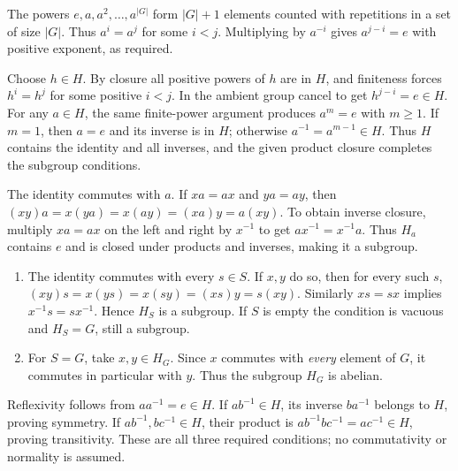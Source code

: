 
The powers $e,a,a^2,\ldots,a^{|G|}$ form $|G|+1$ elements counted with repetitions in a set of size $|G|$. Thus $a^i=a^j$ for some $i<j$. Multiplying by $a^{-i}$ gives $a^{j-i}=e$ with positive exponent, as required.


Choose $h\in H$. By closure all positive powers of $h$ are in $H$, and finiteness forces $h^i=h^j$ for some positive $i<j$. In the ambient group cancel to get $h^{j-i}=e\in H$. For any $a\in H$, the same finite-power argument produces $a^m=e$ with $m\ge1$. If $m=1$, then $a=e$ and its inverse is in $H$; otherwise $a^{-1}=a^{m-1}\in H$. Thus $H$ contains the identity and all inverses, and the given product closure completes the subgroup conditions.


The identity commutes with $a$. If $xa=ax$ and $ya=ay$, then $(xy)a=x(ya)=x(ay)=(xa)y=a(xy)$. To obtain inverse closure, multiply $xa=ax$ on the left and right by $x^{-1}$ to get $ax^{-1}=x^{-1}a$. Thus $H_a$ contains $e$ and is closed under products and inverses, making it a subgroup.


\begin{enumerate}[label=(\alph*)]
\item The identity commutes with every $s\in S$. If $x,y$ do so, then for every such $s$, $(xy)s=x(ys)=x(sy)=(xs)y=s(xy)$. Similarly $xs=sx$ implies $x^{-1}s=sx^{-1}$. Hence $H_S$ is a subgroup. If $S$ is empty the condition is vacuous and $H_S=G$, still a subgroup.
\item For $S=G$, take $x,y\in H_G$. Since $x$ commutes with \emph{every} element of $G$, it commutes in particular with $y$. Thus the subgroup $H_G$ is abelian.
\end{enumerate}


Reflexivity follows from $aa^{-1}=e\in H$. If $ab^{-1}\in H$, its inverse $ba^{-1}$ belongs to $H$, proving symmetry. If $ab^{-1},bc^{-1}\in H$, their product is $ab^{-1}bc^{-1}=ac^{-1}\in H$, proving transitivity. These are all three required conditions; no commutativity or normality is assumed.


